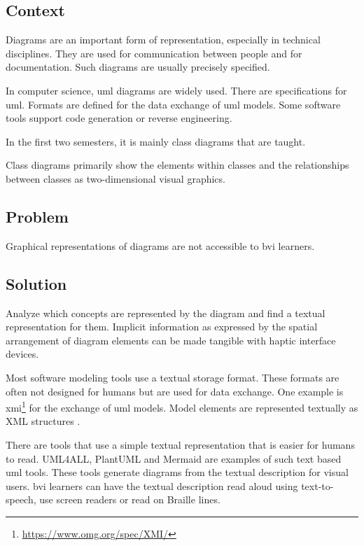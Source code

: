 \patternTwo

\subsection*{Context}

    Diagrams are an important form of representation, especially in technical disciplines. They are used for communication between people and for documentation. 
Such diagrams are usually precisely specified. 

In computer science, \ac{uml} diagrams  are widely used. There are specifications for \ac{uml}. Formats are defined for the data exchange of \ac{uml} models. 
Some software tools support code generation or reverse engineering.

In the first two semesters, it is mainly class diagrams that are taught.

Class diagrams primarily show the elements within classes and the relationships between classes as two-dimensional visual graphics.
    
\subsection*{Problem}

\begin{itshape}
Graphical representations of diagrams are not accessible to \ac{bvi} learners.
\end{itshape}

\subsection*{Solution}

\begin{sol}
Analyze which concepts are represented by the diagram and find a textual representation for them. 
Implicit information as expressed by the spatial arrangement of diagram elements can be made tangible with haptic interface devices.  
\end{sol}

Most software modeling tools use  a textual storage format. These formats are often not designed for humans but are used for data exchange. One example is \ac{xmi}\footnote{\url{https://www.omg.org/spec/XMI/}} for the exchange of \ac{uml} models. Model elements are represented textually as XML structures .

There are tools that use a simple textual representation that is easier for humans to read. UML4ALL, PlantUML and Mermaid are examples of such text based \ac{uml} tools.
These tools generate diagrams from the textual description for visual users. 
\ac{bvi} learners can have the textual description read aloud using text-to-speech, use screen readers or read on Braille lines.

